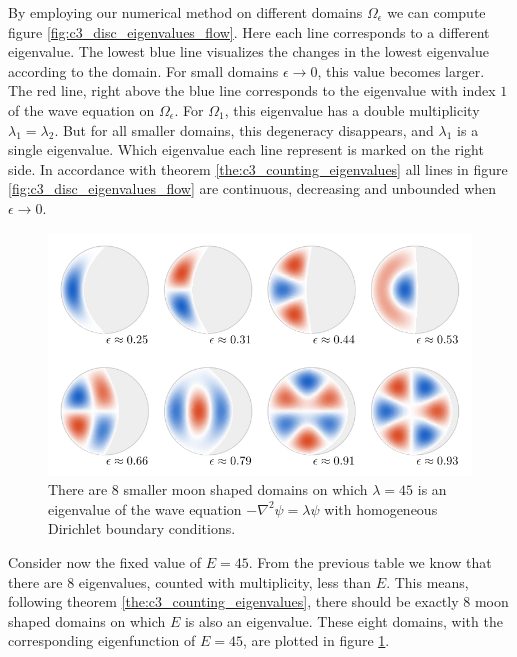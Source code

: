 By employing our numerical method on different domains $\Omega_\epsilon$ we can compute figure \ref{fig:c3_disc_eigenvalues_flow}. Here each line corresponds to a different eigenvalue. The lowest blue line visualizes the changes in the lowest eigenvalue according to the domain. For small domains $\epsilon \to 0$, this value becomes larger. The red line, right above the blue line corresponds to the eigenvalue with index $1$ of the wave equation on $\Omega_\epsilon$. For $\Omega_1$, this eigenvalue has a double multiplicity $\lambda_1 = \lambda_2$. But for all smaller domains, this degeneracy disappears, and $\lambda_1$ is a single eigenvalue. Which eigenvalue each line represent is marked on the right side. In accordance with theorem \ref{the:c3_counting_eigenvalues} all lines in figure \ref{fig:c3_disc_eigenvalues_flow} are continuous, decreasing and unbounded when $\epsilon \to 0$.


\begin{figure}
    \begin{center}
        \includegraphics[width=\textwidth]{img/chapter3/on_disc/solutions.pdf}
        \caption{There are $8$ smaller moon shaped domains on which $\lambda = 45$ is an eigenvalue of the wave equation $-\nabla^2 \psi = \lambda \psi$ with homogeneous Dirichlet boundary conditions.}
        \label{fig:c3_disc_solutions}
    \end{center}
\end{figure}


Consider now the fixed value of $E = 45$. From the previous table we know that there are $8$ eigenvalues, counted with multiplicity, less than $E$. This means, following theorem \ref{the:c3_counting_eigenvalues}, there should be exactly $8$ moon shaped domains on which $E$ is also an eigenvalue. These eight domains, with the corresponding eigenfunction of $E = 45$, are plotted in figure \ref{fig:c3_disc_solutions}.

